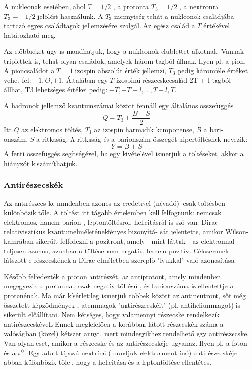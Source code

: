 \documentclass[../main.tex]{subfiles}
\begin{document}
A nukleonok esetében, ahol $T = 1/2$ , a protonra $T_3 = 1/2$ , a neutronra $T_3 = -1/2$ jelölést használunk. A $T_3$ mennyiség tehát a nukleonok
családjába tartozó egyes családtagok jellemzésére szolgál. Az egész család a $T$ értékével határozható meg.

Az előbbieket úgy is mondhatjuk, hogy a nukleonok clublettet alkotnak. Vannak tripiettek is, tehát olyan családok, amelyek három tagból állnak. Ilyen pl. a pion. A pioncsaládot a $T = 1$ izospin abszolút érték jellemzi, $T_3$ pedig háromféle értéket vehet fel: $-1 , O, +1$. Általában egy $T$
izospinű részecskecsalád 2T + l tagból állhat, T3 lehetséges értékei pedig:
$- T, -T+ l, ... , T - l , T$.

A hadronok jellemző kvantumszámai között fennáll egy általános összefüggés:
\begin{equation}
    Q = T_3 + \frac{B + S}{2}
\end{equation}
Itt $Q$ az elektromos töltés, $T_3$ az izospin harmadik komponense, $B$ a bari-
onszám, $S$ a ritkaság. A ritkaság és a barionszám összegét hipertöltésnek
nevezik:
\begin{equation}
    Y = B + S
\end{equation}
A fenti összefüggés segítségével, ha egy kivételével ismerjük a töltéseket, akkor a hiányzót kiszámíthatjuk.

\subsubsection*{Antirészecskék}
Az antirészecs ke mindenben azonos az eredetivel (névadó), csak töltésben különbözik tőle. A töltést itt tágabb értelemben kell felfognunk: nemcsak
elektromos, hanem barion-, leptontöltésről, helicitásról is szó van. Dirac relativisztikus kvantumelméleténekfényes bizonyítá-
sát jelentette, amikor Wilson-kamrában sikerült felfedezni a pozitront, amely
- mint láttuk - az elektronnal teljesen azonos, azonban a töltése nem negatív, hanem pozitív. Célszerűnek látszott e részecskének a Dirac-elméletben
szereplő "lyukkal" való azonosítása.

Később felfedezték a proton antirészét, az antiprotont, amely mindenben megegyezik a protonnal, csak negatív töltésű , és barionszáma is ellentettje a protonénak. Ma már kísérletileg ismerjük többek
között az antineutront, sőt még összetett képződmények , atommagok "antirészecskéit" (pl. antihéliummagot) is sikerült előállítani. Nem kétséges,
hogy valamennyi részecske rendelkezik antirészecskéveL Ennek megfelelően
a korábban látott részecskék száma a valóságban (közel) kétszer
annyi, mert mindegyikhez rendelhető egy antirészecske. Van olyan eset, amikor a részecske és az antirészecskéje ugyanaz. Ilyen pl. a foton és a $\pi^0$. Egy
adott típusú neutrínó (mondjuk elektronneutrínó) antirészecskéje abban különbözik tőle , hogy a helicitása és a leptontöltése ellentétes.
\end{document}
